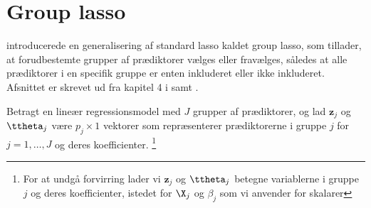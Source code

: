 \section{Group lasso}
\citep{group_lasso} introducerede en generalisering af standard lasso kaldet group lasso, som tillader, at forudbestemte grupper af prædiktorer vælges eller fravælges, således at alle prædiktorer i en specifik gruppe er enten inkluderet eller ikke inkluderet.
Afsnittet er skrevet ud fra kapitel 4 i \citep{hastie} samt \citep{group_lasso}.

Betragt en lineær regressionsmodel med $J$ grupper af prædiktorer, og lad $\mathbf{z}_j$ og \(\ttheta_j\) være \(p_j \times 1\) vektorer som repræsenterer prædiktorerne i gruppe $j$ for $j=1, \ldots, J$ og deres koefficienter. \footnote{For at undgå forvirring lader vi \(\mathbf{z}_j\) og \(\ttheta_j\) betegne variablerne i gruppe \(j\) og deres koefficienter, istedet for \(\X_j\) og \(\beta_j\) som vi anvender for skalarer}

